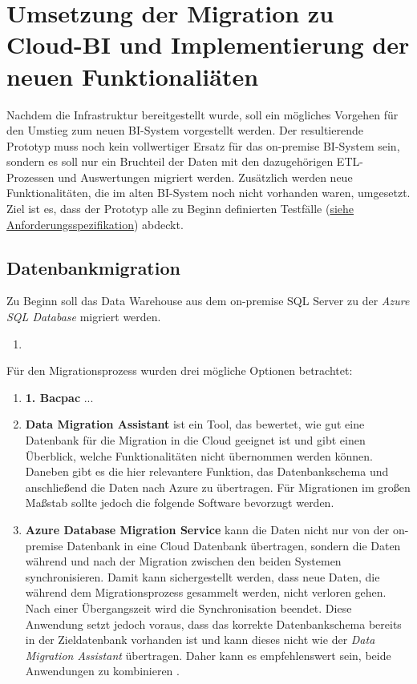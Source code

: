 \section[Umstieg zu Cloud-BI]{Umsetzung der Migration zu Cloud-BI und Implementierung der neuen Funktionaliäten} \label{sec:praktischeUmsetzung:Migration}
Nachdem die Infrastruktur bereitgestellt wurde, soll ein mögliches Vorgehen für den Umstieg zum neuen BI-System vorgestellt werden. Der resultierende Prototyp muss noch kein vollwertiger Ersatz für das on-premise BI-System sein, sondern es soll nur ein Bruchteil der Daten mit den dazugehörigen ETL-Prozessen und Auswertungen migriert werden. Zusätzlich werden neue Funktionalitäten, die im alten BI-System noch nicht vorhanden waren, umgesetzt. Ziel ist es, dass der Prototyp alle zu Beginn definierten Testfälle (\hyperref[sec:anforderungsspezifikation:funktionaleAnforderungen]{siehe Anforderungsspezifikation}) abdeckt.

\subsection{Datenbankmigration} \label{subsec:praktischeUmsetzung:Datenmigration}
Zu Beginn soll das Data Warehouse aus dem on-premise SQL Server zu der \textit{Azure SQL Database} migriert werden. 


\begin{enumerate}
\item 
\end{enumerate}

Für den Migrationsprozess wurden drei mögliche Optionen betrachtet: 
\begin{enumerate}
\item \textbf{1. Bacpac} ...
\item \textbf{Data Migration Assistant} ist ein Tool, das bewertet, wie gut eine Datenbank für die Migration in die Cloud geeignet ist und gibt einen Überblick, welche Funktionalitäten nicht übernommen werden können. Daneben gibt es die hier relevantere Funktion, das Datenbankschema und anschließend die Daten nach Azure zu übertragen. Für Migrationen im großen Maßstab sollte jedoch die folgende Software bevorzugt werden. 
\item \textbf{Azure Database Migration Service} kann die Daten nicht nur von der on-premise Datenbank in eine Cloud Datenbank übertragen, sondern die Daten während und nach der Migration zwischen den beiden Systemen synchronisieren. Damit kann sichergestellt werden, dass neue Daten, die während dem Migrationsprozess gesammelt werden, nicht verloren gehen. Nach einer Übergangszeit wird die Synchronisation beendet. Diese Anwendung setzt jedoch voraus, dass das korrekte Datenbankschema bereits in der Zieldatenbank vorhanden ist und kann dieses nicht wie der \textit{Data Migration Assistant} übertragen. Daher kann es empfehlenswert sein, beide Anwendungen zu kombinieren \cite{soh_microsoft_2020}.
\end{enumerate}

